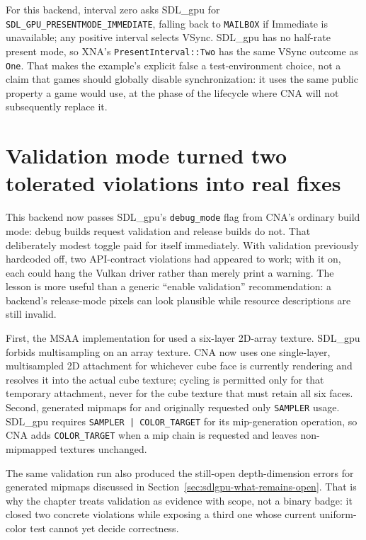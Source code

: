 For this backend, interval zero asks SDL\_gpu for \texttt{SDL\_GPU\_PRESENTMODE\_IMMEDIATE},
falling back to \texttt{MAILBOX} if Immediate is unavailable; any positive interval selects
VSync. SDL\_gpu has no half-rate present mode, so XNA's \texttt{PresentInterval::Two} has the
same VSync outcome as \texttt{One}. That makes the example's explicit false a test-environment
choice, not a claim that games should globally disable synchronization: it uses the same public
property a game would use, at the phase of the lifecycle where CNA will not subsequently replace
it.

\section{Validation mode turned two tolerated violations into real fixes}

This backend now passes SDL\_gpu's \texttt{debug\_mode} flag from CNA's ordinary build mode:
debug builds request validation and release builds do not. That deliberately modest toggle paid
for itself immediately. With validation previously hardcoded off, two API-contract violations
had appeared to work; with it on, each could hang the Vulkan driver rather than merely print a
warning. The lesson is more useful than a generic ``enable validation'' recommendation: a
backend's release-mode pixels can look plausible while resource descriptions are still invalid.

First, the MSAA implementation for  used a six-layer 2D-array
texture. SDL\_gpu forbids multisampling on an array texture. CNA now uses one single-layer,
multisampled 2D attachment for whichever cube face is currently rendering and resolves it into
the actual cube texture; cycling is permitted only for that temporary attachment, never for the
cube texture that must retain all six faces. Second, generated mipmaps for 
and  originally requested only \texttt{SAMPLER} usage. SDL\_gpu requires
\texttt{SAMPLER | COLOR\_TARGET} for its mip-generation operation, so CNA adds
\texttt{COLOR\_TARGET} when a mip chain is requested and leaves non-mipmapped textures unchanged.

The same validation run also produced the still-open depth-dimension errors for generated
 mipmaps discussed in Section~\ref{sec:sdlgpu-what-remains-open}. That is why
the chapter treats validation as evidence with scope, not a binary badge: it closed two concrete
violations while exposing a third one whose current uniform-color test cannot yet decide
correctness.

